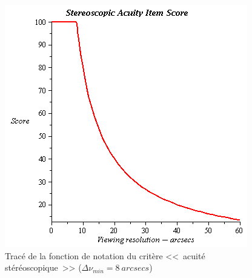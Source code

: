 	\begin{figure}
		\centering
		\includegraphics[scale=.9]{Figures/StereoAcuity}
		\caption{Tracé de la fonction de notation du critère <<~acuité stéréoscopique~>> ($\Delta \nu_{min} = 8~arcsecs$)}
		\label{fig:stereo_acuity}
	\end{figure}